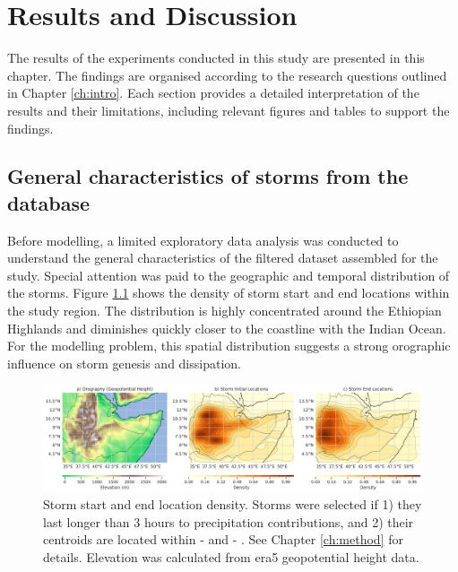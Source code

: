 \chapter{Results and Discussion}
\label{ch:results}

The results of the experiments conducted in this study are presented in this chapter. The findings are organised according to the research questions outlined in Chapter \ref{ch:intro}. Each section provides a detailed interpretation of the results and their limitations, including relevant figures and tables to support the findings.

\section{General characteristics of storms from the database}

Before modelling, a limited exploratory data analysis was conducted to understand the general characteristics of the filtered dataset assembled for the study. Special attention was paid to the geographic and temporal distribution of the storms. Figure \ref{fig:orography_storm_init_end_kde} shows the density of storm start and end locations within the study region. The distribution is highly concentrated around the Ethiopian Highlands and diminishes quickly closer to the coastline with the Indian Ocean. For the modelling problem, this spatial distribution suggests a strong orographic influence on storm genesis and dissipation.

\begin{figure}[ht]
    \centering
    \includegraphics[width=\textwidth]{../figures/generated/exploration/orography_storm_init_end_kde.png}
    \caption{Storm start and end location density. Storms were selected if 1) they last longer than 3 hours to precipitation contributions, and 2) their centroids are located within  -  and  -  \citep{Hill2023}. See Chapter \ref{ch:method} for details. Elevation was calculated from \acrshort{era5} geopotential height data.}
    \label{fig:orography_storm_init_end_kde}
\end{figure}

